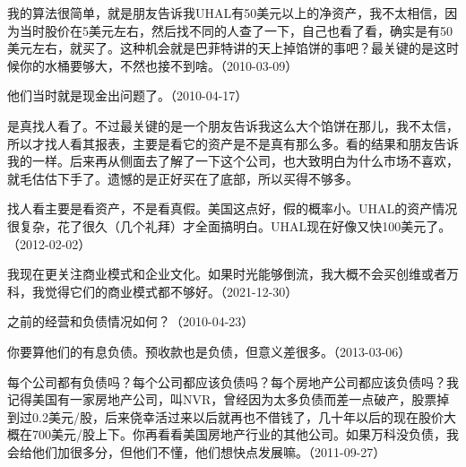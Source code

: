 
我的算法很简单，就是朋友告诉我UHAL有50美元以上的净资产，我不太相信，因为当时股价在5美元左右，然后找不同的人查了一下，自己也看了看，确实是有50美元左右，就买了。这种机会就是巴菲特讲的天上掉馅饼的事吧？最关键的是这时候你的水桶要够大，不然也接不到啥。（2010-03-09）


他们当时就是现金出问题了。（2010-04-17）


是真找人看了。不过最关键的是一个朋友告诉我这么大个馅饼在那儿，我不太信，所以才找人看其报表，主要是看它的资产是不是真有那么多。看的结果和朋友告诉我的一样。后来再从侧面去了解了一下这个公司，也大致明白为什么市场不喜欢，就毛估估下手了。遗憾的是正好买在了底部，所以买得不够多。


找人看主要是看资产，不是看真假。美国这点好，假的概率小。UHAL的资产情况很复杂，花了很久（几个礼拜）才全面搞明白。UHAL现在好像又快100美元了。（2012-02-02）


我现在更关注商业模式和企业文化。如果时光能够倒流，我大概不会买创维或者万科，我觉得它们的商业模式都不够好。（2021-12-30）


之前的经营和负债情况如何？（2010-04-23）


你要算他们的有息负债。预收款也是负债，但意义差很多。（2013-03-06）


每个公司都有负债吗？每个公司都应该负债吗？每个房地产公司都应该负债吗？我记得美国有一家房地产公司，叫NVR，曾经因为太多负债而差一点破产，股票掉到过0.2美元/股，后来侥幸活过来以后就再也不借钱了，几十年以后的现在股价大概在700美元/股上下。你再看看美国房地产行业的其他公司。如果万科没负债，我会给他们加很多分，但他们不懂，他们想快点发展嘛。（2011-09-27）

